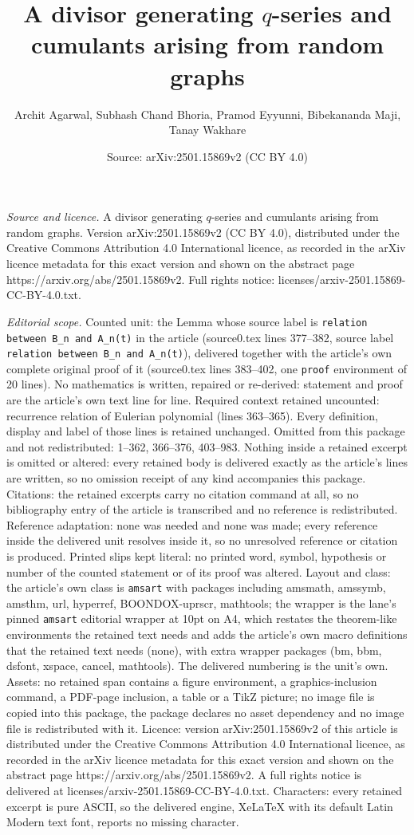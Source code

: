 \documentclass[10pt,a4paper]{amsart}
\title[A divisor generating $q$-series and cumulants arising from r]{A divisor generating $q$-series and cumulants arising from random graphs}
\author{Archit Agarwal, Subhash Chand Bhoria, Pramod Eyyunni, Bibekananda Maji, Tanay Wakhare}
\date{Source: arXiv:2501.15869v2 (CC BY 4.0)}
\begin{document}
\maketitle

\noindent\emph{Source and licence.} A divisor generating $q$-series and cumulants arising from random graphs. Version arXiv:2501.15869v2 (CC BY 4.0), distributed under the Creative Commons Attribution 4.0 International licence, as recorded in the arXiv licence metadata for this exact version and shown on the abstract page https://arxiv.org/abs/2501.15869v2. Full rights notice: licenses/arxiv-2501.15869-CC-BY-4.0.txt.\par\smallskip

\noindent\textit{Editorial scope.} Counted unit: the Lemma whose source label is \texttt{relation between B\_n and A\_n(t)} in the article (source0.tex lines 377--382, source label \texttt{relation between B\_n and A\_n(t)}), delivered together with the article's own complete original proof of it (source0.tex lines 383--402, one \texttt{proof} environment of 20 lines). No mathematics is written, repaired or re-derived: statement and proof are the article's own text line for line. Required context retained uncounted: recurrence relation of Eulerian polynomial (lines 363--365). Every definition, display and label of those lines is retained unchanged. Omitted from this package and not redistributed: 1--362, 366--376, 403--983. Nothing inside a retained excerpt is omitted or altered: every retained body is delivered exactly as the article's lines are written, so no omission receipt of any kind accompanies this package. Citations: the retained excerpts carry no citation command at all, so no bibliography entry of the article is transcribed and no reference is redistributed. Reference adaptation: none was needed and none was made; every reference inside the delivered unit resolves inside it, so no unresolved reference or citation is produced. Printed slips kept literal: no printed word, symbol, hypothesis or number of the counted statement or of its proof was altered. Layout and class: the article's own class is \texttt{amsart} with packages including amsmath, amssymb, amsthm, url, hyperref, BOONDOX-uprscr, mathtools; the wrapper is the lane's pinned \texttt{amsart} editorial wrapper at 10pt on A4, which restates the theorem-like environments the retained text needs and adds the article's own macro definitions that the retained text needs (none), with extra wrapper packages (bm, bbm, dsfont, xspace, cancel, mathtools). The delivered numbering is the unit's own. Assets: no retained span contains a figure environment, a graphics-inclusion command, a PDF-page inclusion, a table or a TikZ picture; no image file is copied into this package, the package declares no asset dependency and no image file is redistributed with it. Licence: version arXiv:2501.15869v2 of this article is distributed under the Creative Commons Attribution 4.0 International licence, as recorded in the arXiv licence metadata for this exact version and shown on the abstract page https://arxiv.org/abs/2501.15869v2. A full rights notice is delivered at licenses/arxiv-2501.15869-CC-BY-4.0.txt. Characters: every retained excerpt is pure ASCII, so the delivered engine, XeLaTeX with its default Latin Modern text font, reports no missing character.
\end{document}
